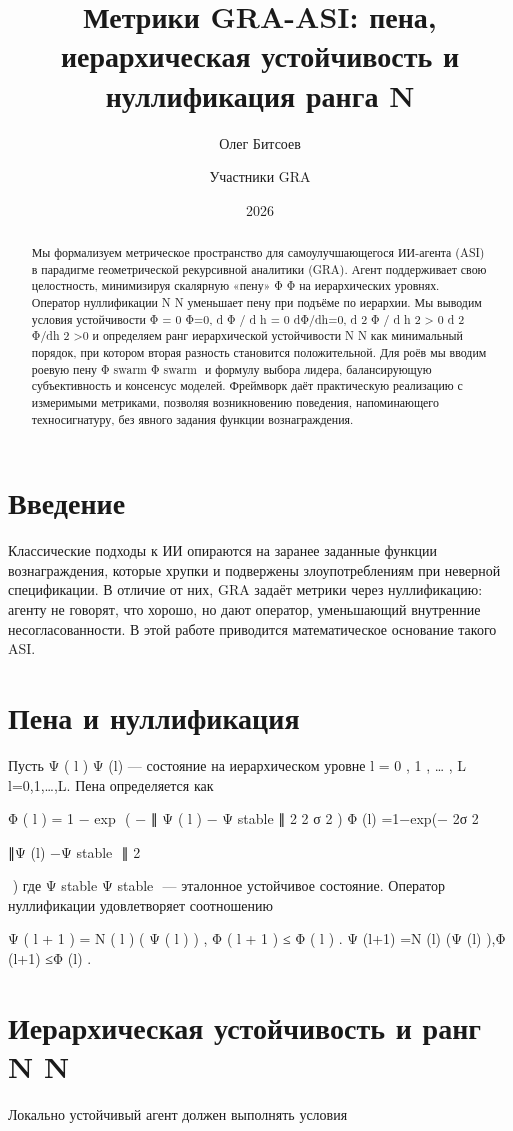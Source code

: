 \documentclass{article}
\title{Метрики GRA-ASI: пена, иерархическая устойчивость и нуллификация ранга N}
\author{Олег Битсоев \and Участники GRA}
\date{2026}
\begin{document}
\maketitle

\begin{abstract}
Мы формализуем метрическое пространство для самоулучшающегося ИИ-агента (ASI) в парадигме геометрической рекурсивной аналитики (GRA). Агент поддерживает свою целостность, минимизируя скалярную «пену» 
Φ
Φ на иерархических уровнях. Оператор нуллификации 
N
N уменьшает пену при подъёме по иерархии. Мы выводим условия устойчивости 
Φ
=
0
Φ=0, 
d
Φ
/
d
h
=
0
dΦ/dh=0, 
d
2
Φ
/
d
h
2
>
0
d 
2
 Φ/dh 
2
 >0 и определяем ранг иерархической устойчивости 
N
N как минимальный порядок, при котором вторая разность становится положительной. Для роёв мы вводим роевую пену 
Φ
swarm
Φ 
swarm
​
  и формулу выбора лидера, балансирующую субъективность и консенсус моделей. Фреймворк даёт практическую реализацию с измеримыми метриками, позволяя возникновению поведения, напоминающего техносигнатуру, без явного задания функции вознаграждения.
\end{abstract}

\section{Введение}
Классические подходы к ИИ опираются на заранее заданные функции вознаграждения, которые хрупки и подвержены злоупотреблениям при неверной спецификации. В отличие от них, GRA задаёт метрики через нуллификацию: агенту не говорят, что хорошо, но дают оператор, уменьшающий внутренние несогласованности. В этой работе приводится математическое основание такого ASI.

\section{Пена и нуллификация}
Пусть 
Ψ
(
l
)
Ψ 
(l)
  — состояние на иерархическом уровне 
l
=
0
,
1
,
…
,
L
l=0,1,…,L. Пена определяется как

Φ
(
l
)
=
1
−
exp
⁡
(
−
∥
Ψ
(
l
)
−
Ψ
stable
∥
2
2
σ
2
)
Φ 
(l)
 =1−exp(− 
2σ 
2
 
∥Ψ 
(l)
 −Ψ 
stable
​
 ∥ 
2
 
​
 )
где 
Ψ
stable
Ψ 
stable
​
  — эталонное устойчивое состояние. Оператор нуллификации удовлетворяет соотношению

Ψ
(
l
+
1
)
=
N
(
l
)
(
Ψ
(
l
)
)
,
Φ
(
l
+
1
)
≤
Φ
(
l
)
.
Ψ 
(l+1)
 =N 
(l)
 (Ψ 
(l)
 ),Φ 
(l+1)
 ≤Φ 
(l)
 .
\section{Иерархическая устойчивость и ранг 
N
N}
Локально устойчивый агент должен выполнять условия
\end{document}
